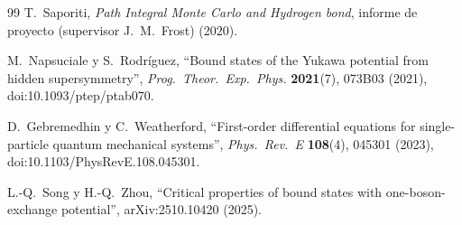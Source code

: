 \documentclass[11pt]{article}
\begin{document}
\begin{thebibliography}{99}
 T.~Saporiti, \emph{Path Integral Monte Carlo and Hydrogen bond}, informe de proyecto (supervisor J.~M.~Frost) (2020).

 M.~Napsuciale y S.~Rodríguez, ``Bound states of the Yukawa potential from hidden supersymmetry'', \emph{Prog.\ Theor.\ Exp.\ Phys.} \textbf{2021}(7), 073B03 (2021), doi:10.1093/ptep/ptab070.

 D.~Gebremedhin y C.~Weatherford, ``First-order differential equations for single-particle quantum mechanical systems'', \emph{Phys.\ Rev.\ E} \textbf{108}(4), 045301 (2023), doi:10.1103/PhysRevE.108.045301.

 L.-Q.~Song y H.-Q.~Zhou, ``Critical properties of bound states with one-boson-exchange potential'', arXiv:2510.10420 (2025).

\end{thebibliography}
\end{document}
